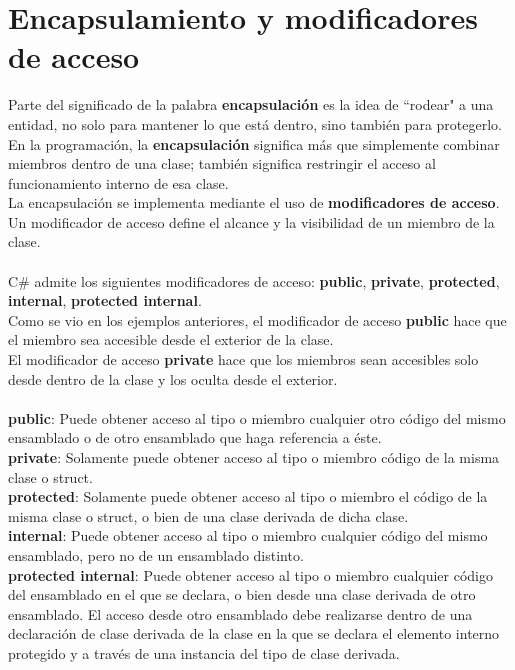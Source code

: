 \documentclass[12pt,a4paper]{report}
\begin{document}
\section{Encapsulamiento y modificadores de acceso}
Parte del significado de la palabra \textbf{encapsulación} es la idea de ``rodear" a una entidad, no solo para mantener lo que está dentro, sino también para protegerlo.\\En la programación, la \textbf{encapsulación} significa más que simplemente combinar miembros dentro de una clase; también significa restringir el acceso al funcionamiento interno de esa clase.\\La encapsulación se implementa mediante el uso de \textbf{modificadores de acceso}. Un modificador de acceso define el alcance y la visibilidad de un miembro de la clase.\\\\C\# admite los siguientes modificadores de acceso: \textbf{public}, \textbf{private},\textbf{ protected}, \textbf{internal}, \textbf{protected internal}.\\Como se vio en los ejemplos anteriores, el modificador de acceso \textbf{public} hace que el miembro sea accesible desde el exterior de la clase.\\El modificador de acceso \textbf{ private} hace que los miembros sean accesibles solo desde dentro de la clase y los oculta desde el exterior.\\\\\textbf{public}: Puede obtener acceso al tipo o miembro cualquier otro código del mismo ensamblado o de otro ensamblado que haga referencia a éste.\\\textbf{private}: Solamente puede obtener acceso al tipo o miembro código de la misma clase o struct.\\\textbf{protected}: Solamente puede obtener acceso al tipo o miembro el código de la misma clase o struct, o bien de una clase derivada de dicha clase.\\\textbf{internal}: Puede obtener acceso al tipo o miembro cualquier código del mismo ensamblado, pero no de un ensamblado distinto.\\\textbf{protected internal}: Puede obtener acceso al tipo o miembro cualquier código del ensamblado en el que se declara, o bien desde una clase derivada de otro ensamblado. El acceso desde otro ensamblado debe realizarse dentro de una declaración de clase derivada de la clase en la que se declara el elemento interno protegido y a través de una instancia del tipo de clase derivada.
\end{document}
